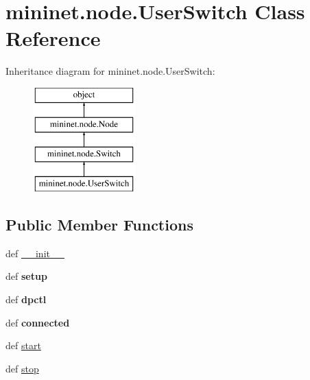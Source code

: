 \hypertarget{classmininet_1_1node_1_1UserSwitch}{\section{mininet.\-node.\-User\-Switch Class Reference}
\label{classmininet_1_1node_1_1UserSwitch}
}
Inheritance diagram for mininet.\-node.\-User\-Switch\-:\begin{figure}[H]
\begin{center}
\leavevmode
\includegraphics[height=4.000000cm]{classmininet_1_1node_1_1UserSwitch}
\end{center}
\end{figure}
\subsection*{Public Member Functions}
\begin{DoxyCompactItemize}
\item 
def \hyperlink{classmininet_1_1node_1_1UserSwitch_ac22742d054d03bfa9b62ce4acd305b51}{\-\_\-\-\_\-init\-\_\-\-\_\-}
\item 
\hypertarget{classmininet_1_1node_1_1UserSwitch_a3cbcdd424e0ddb14ff7705f6e470e883}{def {\bfseries setup}}\label{classmininet_1_1node_1_1UserSwitch_a3cbcdd424e0ddb14ff7705f6e470e883}

\item 
\hypertarget{classmininet_1_1node_1_1UserSwitch_ad33189e5046bd69654a229340a4dacca}{def {\bfseries dpctl}}\label{classmininet_1_1node_1_1UserSwitch_ad33189e5046bd69654a229340a4dacca}

\item 
\hypertarget{classmininet_1_1node_1_1UserSwitch_a06ee71c1851b5a6ec63012be4bb64606}{def {\bfseries connected}}\label{classmininet_1_1node_1_1UserSwitch_a06ee71c1851b5a6ec63012be4bb64606}

\item 
def \hyperlink{classmininet_1_1node_1_1UserSwitch_af5651c986ae4c50c04a12138da52b854}{start}
\item 
def \hyperlink{classmininet_1_1node_1_1UserSwitch_a5e07816289fa23921ab679b3eb019b6b}{stop}
\end{DoxyCompactItemize}
